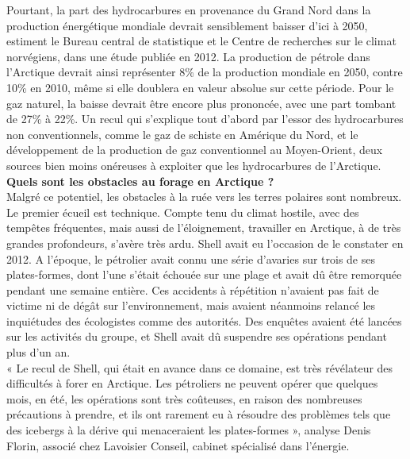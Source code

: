 \documentclass[8pt]{article}
\begin{document}
Pourtant, la part des hydrocarbures en provenance du Grand Nord dans la production énergétique mondiale devrait sensiblement baisser d’ici à 2050, estiment le Bureau central de statistique et le Centre de recherches sur le climat norvégiens, dans une étude publiée en 2012. La production de pétrole dans l’Arctique devrait ainsi représenter 8\% de la production mondiale en 2050, contre 10\% en 2010, même si elle doublera en valeur absolue sur cette période. Pour le gaz naturel, la baisse devrait être encore plus prononcée, avec une part tombant de 27\% à 22\%. Un recul qui s’explique tout d’abord par l’essor des hydrocarbures non conventionnels, comme le gaz de schiste en Amérique du Nord, et le développement de la production de gaz conventionnel au Moyen-Orient, deux sources bien moins onéreuses à exploiter que les hydrocarbures de l’Arctique.\\

\textbf{Quels sont les obstacles au forage en Arctique ?}\\

Malgré ce potentiel, les obstacles à la ruée vers les terres polaires sont nombreux. Le premier écueil est technique. Compte tenu du climat hostile, avec des tempêtes fréquentes, mais aussi de l’éloignement, travailler en Arctique, à de très grandes profondeurs, s’avère très ardu. Shell avait eu l’occasion de le constater en 2012. A l’époque, le pétrolier avait connu une série d’avaries sur trois de ses plates-formes, dont l’une s’était échouée sur une plage et avait dû être remorquée pendant une semaine entière. Ces accidents à répétition n’avaient pas fait de victime ni de dégât sur l’environnement, mais avaient néanmoins relancé les inquiétudes des écologistes comme des autorités. Des enquêtes avaient été lancées sur les activités du groupe, et Shell avait dû suspendre ses opérations pendant plus d’un an.\\

« Le recul de Shell, qui était en avance dans ce domaine, est très révélateur des difficultés à forer en Arctique. Les pétroliers ne peuvent opérer que quelques mois, en été, les opérations sont très coûteuses, en raison des nombreuses précautions à prendre, et ils ont rarement eu à résoudre des problèmes tels que des icebergs à la dérive qui menaceraient les plates-formes », analyse Denis Florin, associé chez Lavoisier Conseil, cabinet spécialisé dans l’énergie.\\
\end{document}
